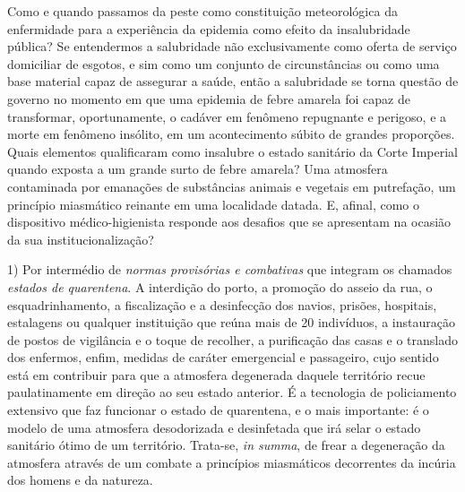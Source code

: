 Como e quando passamos da peste como constituição meteorológica da
enfermidade para a experiência da epidemia como efeito da insalubridade
pública? Se entendermos a salubridade não exclusivamente como oferta de
serviço domiciliar de esgotos, e sim como um conjunto de circunstâncias
ou como uma base material capaz de assegurar a saúde, então a
salubridade se torna questão de governo no momento em que uma epidemia
de febre amarela foi capaz de transformar, oportunamente, o cadáver em
fenômeno repugnante e perigoso, e a morte em fenômeno insólito, em um
acontecimento súbito de grandes proporções. Quais elementos qualificaram
como insalubre o estado sanitário da Corte Imperial quando exposta a um
grande surto de febre amarela? Uma atmosfera contaminada por emanações
de substâncias animais e vegetais em putrefação, um princípio miasmático
reinante em uma localidade datada. E, afinal, como o dispositivo
médico-higienista responde aos desafios que se apresentam na ocasião da
sua institucionalização?

1) Por intermédio de \emph{normas provisórias e combativas} que integram
os chamados \emph{estados de quarentena}. A interdição do porto, a
promoção do asseio da rua, o esquadrinhamento, a fiscalização e a
desinfecção dos navios, prisões, hospitais, estalagens ou qualquer
instituição que reúna mais de 20 indivíduos, a instauração de postos de
vigilância e o toque de recolher, a purificação das casas e o translado
dos enfermos, enfim, medidas de caráter emergencial e passageiro, cujo
sentido está em contribuir para que a atmosfera degenerada daquele
território recue paulatinamente em direção ao seu estado anterior. É a
tecnologia de policiamento extensivo que faz funcionar o estado de
quarentena, e o mais importante: é o modelo de uma atmosfera
desodorizada e desinfetada que irá selar o estado sanitário ótimo de um
território. Trata-se, \emph{in summa}, de frear a degeneração da
atmosfera através de um combate a princípios miasmáticos decorrentes da
incúria dos homens e da natureza.

